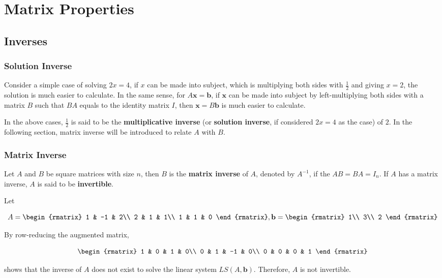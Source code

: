 \documentclass[a4paper,12pt]{article}
\begin{document}
\section{Matrix Properties}
\subsection{Inverses}
\subsubsection{Solution Inverse}
Consider a simple case of solving $2x=4$, if $x$ can be made into subject, which is multiplying both sides with $\frac{1}{2}$ and giving $x=2$, the solution is much easier to calculate. In the same sense, for $A\mathbf{x}=\mathbf{b}$, if $\mathbf{x}$ can be made into subject by left-multiplying both sides with a matrix $B$ such that $BA$ equals to the identity matrix $I$, then $\mathbf{x}=B\mathbf{b}$ is much easier to calculate.\n

In the above cases, $\frac{1}{2}$ is said to be the \textbf{multiplicative inverse} (or \textbf{solution inverse}, if considered $2x=4$ as the case) of $2$. In the following section, matrix inverse will be introduced to relate $A$ with $B$.

\subsubsection{Matrix Inverse}
\begin{dft}
  Let $A$ and $B$ be square matrices with size $n$, then $B$ is the \textbf{matrix inverse} of $A$, denoted by $A^{-1}$, if the $AB=BA=I_{n}$. If $A$ has a matrix inverse, $A$ is said to be \textbf{invertible}.
\end{dft}\n

\begin{exm}
  Let

  $$A=\begin{rmatrix}
    1 & -1 & 2\\
    2 & 1 & 1\\
    1 & 1 & 0
  \end{rmatrix},\mathbf{b}=\begin{rmatrix}
    1\\
    3\\
    2
  \end{rmatrix}$$\s

  By row-reducing the augmented matrix,

  $$\begin{rmatrix}
    1 & 0 & 1 & 0\\
    0 & 1 & -1 & 0\\
    0 & 0 & 0 & 1
  \end{rmatrix}$$\s

  shows that the inverse of $A$ does not exist to solve the linear system $LS(A,\mathbf{b})$. Therefore, $A$ is not invertible.
\end{exm}\n
\end{document}
